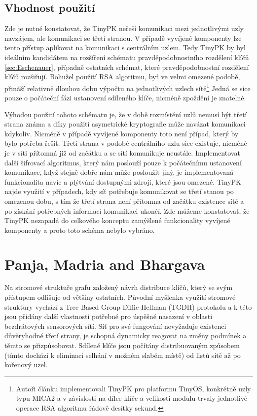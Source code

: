 \documentclass[11pt,final,twoside]{fithesis2}
\begin{document}
\subsection{Vhodnost použití}

Zde je nutné konstatovat, že TinyPK neřeší komunikaci mezi jednotlivými uzly navzájem, ale komunikaci se třetí stranou. V případě vyvíjené 
komponenty lze tento přístup aplikovat na komunikaci s centrálním uzlem. Tedy TinyPK by byl ideálním kandidátem na rozšíření schématu pravděpodobnostního
rozdělení klíčů \ref{sec:Eschenauer}, případně ostatních schémat, které pravděpodobnostní rozdělení klíčů rozšiřují.
Bohužel použití RSA algoritmu, byť ve velmi omezené podobě, přináší relativně dlouhou dobu výpočtu na jednotlivých uzlech sítě\footnote{ 
Autoři článku implementovali TinyPK pro platformu TinyOS, konkrétně uzly typu MICA2 \cite{Inc.} a v závislosti na dílce klíče a velikosti modulu
trvaly jednotlivé operace RSA algoritmu řádově desítky sekund.} Jedná se sice pouze o počáteční fázi ustanovení sdíleného klíče, nicméně zpoždění je znatelné.

Výhodou použití tohoto schématu je, že v době rozmístění uzlů nemusí být třetí strana známa a díky použití asymetrické kryptografie může navázat komunikaci kdykoliv.
Nicméně v případě vyvíjené komponenty toto není případ, který by bylo potřeba řešit. Třetí strana v podobě centrálního uzlu sice existuje, nicméně je v síti přítomná již 
od začátku a se sítí komunikuje neustále. Implementovat další šifrovací algoritmus, který nám poslouží pouze k počátečnímu ustanovení komunikace, když stejně dobře 
nám může posloužit jiný, je implementovaná funkcionalita navíc a plýtvání dostupnými zdroji, které jsou omezené. TinyPK najde využití v případech, kdy síť potřebuje komunikovat
se třetí stanou po omezenou dobu, s tím že třetí strana není přítomna od začátku existence sítě a po získání potřebných informací komunikaci ukončí. Zde můžeme konstatovat, že 
TinyPK nezapadá do celkového konceptu zamýšlené funkcionality vyvíjené komponenty a proto toto schéma nebylo vybráno. 

\section{Panja, Madria and Bhargava}

Na stromové struktuře grafu založený návrh \cite{Panja2007} distribuce klíčů, který se svým přístupem odlišuje od většiny ostatních. Původní myšlenka využití stromové struktury
vychází z Tree Based Group Diffie-Hellman (TGDH) protokolu \cite{Kim2000} a k této jsou přidány další vlastnosti potřebné pro úspěšné nasazení v oblasti bezdrátových sensorových sítí. 
Síť pro své fungování nevyžaduje existenci důvěryhodné třetí strany, je schopná dynamicky reagovat na změny podmínek a těmto se přizpůsobovat. Sdílené klíče jsou počítány distribuovaným 
způsobem (tímto dochází k eliminaci selhání v možném slabém místě) od listů sítě až po kořenový uzel.  
\end{document}
